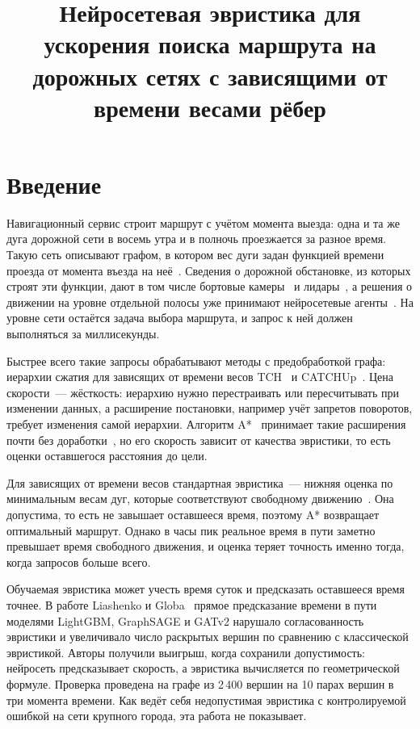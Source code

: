 \documentclass{misisarticle}
\title{Нейросетевая эвристика для ускорения поиска маршрута на дорожных сетях с зависящими от времени весами рёбер}
\begin{document}
\maketitle

\section{Введение}

Навигационный сервис строит маршрут с учётом момента выезда: одна и та же дуга дорожной сети в восемь утра и в полночь проезжается за разное время. Такую сеть описывают графом, в котором вес дуги задан функцией времени проезда от момента въезда на неё~\cite{kaufman1993}. Сведения о дорожной обстановке, из которых строят эти функции, дают в том числе бортовые камеры~\cite{pham2026} и лидары~\cite{vishnevsky2026}, а решения о движении на уровне отдельной полосы уже принимают нейросетевые агенты~\cite{kiselev2025}. На уровне сети остаётся задача выбора маршрута, и запрос к ней должен выполняться за миллисекунды.

Быстрее всего такие запросы обрабатывают методы с предобработкой графа: иерархии сжатия для зависящих от времени весов TCH~\cite{batz2013} и CATCHUp~\cite{strasser2021}. Цена скорости~--- жёсткость: иерархию нужно перестраивать или пересчитывать при изменении данных, а расширение постановки, например учёт запретов поворотов, требует изменения самой иерархии. Алгоритм A*~\cite{hart1968} принимает такие расширения почти без доработки~\cite{strasser2019}, но его скорость зависит от качества эвристики, то есть оценки оставшегося расстояния до цели.

Для зависящих от времени весов стандартная эвристика~--- нижняя оценка по минимальным весам дуг, которые соответствуют свободному движению~\cite{delling2007}. Она допустима, то есть не завышает оставшееся время, поэтому A* возвращает оптимальный маршрут. Однако в часы пик реальное время в пути заметно превышает время свободного движения, и оценка теряет точность именно тогда, когда запросов больше всего.

Обучаемая эвристика может учесть время суток и предсказать оставшееся время точнее. В работе Liashenko и Globa~\cite{liashenko2026} прямое предсказание времени в пути моделями LightGBM, GraphSAGE и GATv2 нарушало согласованность эвристики и увеличивало число раскрытых вершин по сравнению с классической эвристикой. Авторы получили выигрыш, когда сохранили допустимость: нейросеть предсказывает скорость, а эвристика вычисляется по геометрической формуле. Проверка проведена на графе из 2\,400 вершин на 10 парах вершин в три момента времени. Как ведёт себя недопустимая эвристика с контролируемой ошибкой на сети крупного города, эта работа не показывает.
\end{document}

